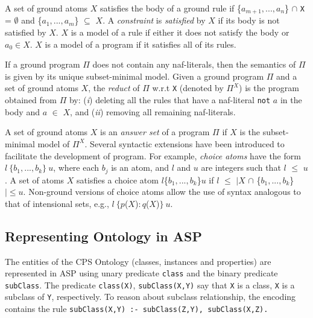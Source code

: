 A set of ground atoms $X$ satisfies the body of a ground rule if \{$a_{m+1}, . . . , a_n$\} $\cap$ \texttt{X} = $\emptyset$ and \{$a_1, . . . , a_m$\} $\subseteq$ $X$. A \textit{constraint} is \textit{satisfied} by $X$ if its body is not satisfied by $X$. $X$ is a model of a rule if either it does not satisfy the body or $a_0 \in X$. $X$ is a model of a program if it satisfies all of its rules.

 If a ground program $\Pi$ does not contain any naf-literals, then the semantics of $\Pi$ is given by its unique subset-minimal model.
Given a ground program $\Pi$ and a set of ground atoms $X$, the \textit{reduct} of \texttt{$\Pi$} w.r.t \texttt{X} (denoted by \texttt{$\Pi^X$}) is the program obtained from  \texttt{$\Pi$} by: ({\em i}) deleting all the rules that have a naf-literal \texttt{not} $a$ in the body and $a$ $\in$ $X$, and ({\em ii}) removing all
remaining naf-literals.

A set of ground atoms $X$ is an \textit{answer set} of a program {$\Pi$} if $X$ is the subset-minimal model of $\Pi^X$.
Several syntactic extensions have been introduced to facilitate the development of program. For example, \emph{choice atoms}
have the form $l\:\{b_1, . . . , b_k\}\:u$, where each $b_j$ is an atom, and $l$ and $u$ are integers such that $l$ $\leq$ $u$.
 A set of atoms $X$ satisfies a choice atom $l$\{$b_1, . . . , b_k$\}$u$ if $l$ $\leq$ $|X$  $\cap $ \{$b_1, . . . , b_k$\}$| \leq u$.
 Non-ground versions of choice atoms allow the use of syntax analogous to that of intensional sets, e.g., $l\:\{p$($X$)$:q$($X$)$\}\:u$.
%
\subsection{Representing Ontology in ASP}
\label{sub-section:asp_representation}
%
The entities of the CPS Ontology (classes, instances and properties) are represented in ASP using unary predicate {\tt \small class} and the binary predicate {\tt \small subClass}. The predicate {\tt \small class(X)}, {\tt \small subClass(X,Y)} say that {\tt \small X} is a class, {\tt \small X} is a subclass of {\tt \small Y}, respectively. To reason about subclass relationship, the encoding contains the rule {\tt \small subClass(X,Y) :- subClass(Z,Y), subClass(X,Z).}

